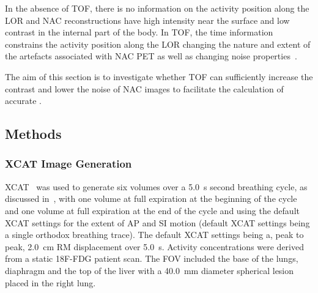         In the absence of \gls{TOF}, there is no information on the activity position along the \gls{LOR} and \gls{NAC} reconstructions have high intensity near the surface and low contrast in the internal part of the body. In \gls{TOF}, the time information constrains the activity position along the \gls{LOR} changing the nature and extent of the artefacts associated with \gls{NAC} \gls{PET} as well as changing noise properties~\parencite{Ter-Pogossian1981}.
        
        The aim of this section is to investigate whether \gls{TOF} can sufficiently increase the contrast and lower the noise of \gls{NAC} images to facilitate the calculation of accurate .
        
        \subsection{Methods} \label{sec:impact_of_tof_on_respiratory_motion_model_estimation_using_pre_gated_no_intra_cycle_motion_nac_pet_methods}
            \subsubsection{XCAT Image Generation} \label{sec:impact_of_tof_on_respiratory_motion_model_estimation_using_pre_gated_no_intra_cycle_motion_nac_pet_methods_xcat_image_generation}
                \gls{XCAT}~\parencite{Segars2010} was used to generate six volumes over a \SI{5.0}{\second} second breathing cycle, as discussed in~, with one volume at full expiration at the beginning of the cycle and one volume at full expiration at the end of the cycle and using the default \gls{XCAT} settings for the extent of \gls{AP} and \gls{SI} motion (default \gls{XCAT} settings being a single orthodox breathing trace). The default \gls{XCAT} settings being a, peak to peak, \SI{2.0}{\centi\metre} \gls{RM} displacement over \SI{5.0}{\second}. Activity concentrations were derived from a static \gls{18F-FDG} patient scan. The \gls{FOV} included the base of the lungs, diaphragm and the top of the liver with a \SI{40.0}{\milli\metre} diameter spherical lesion placed in the right lung.
            

